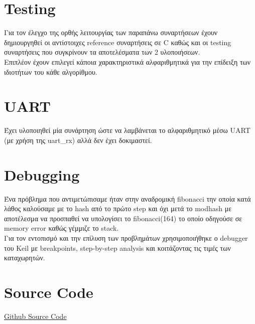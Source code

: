 \documentclass{article}
\begin{document}
\section{Testing}
Για τον έλεγχο της ορθής λειτουργίας των παραπάνω συναρτήσεων έχουν δημιουργηθεί οι αντίστοιχες reference συναρτήσεις σε C καθώς και οι testing συναρτήσεις που συγκρίνουν τα αποτελέσματα των 2 υλοποιήσεων. \\
Επιπλέον έχουν επιλεγεί κάποια χαρακτηριστικά αλφαριθμητικά για την επίδειξη των ιδιοτήτων του κάθε αλγορίθμου. \\

\section{UART}
Έχει υλοποιηθεί μία συνάρτηση ώστε να λαμβάνεται το αλφαριθμητικό μέσω UART (με χρήση της uart\_rx) αλλά δεν έχει δοκιμαστεί. \\

\section{Debugging}
Ένα πρόβλημα που αντιμετώπισαμε ήταν στην αναδρομική fibonacci την οποία κατά λάθος καλούσαμε με το hash από το πρώτο step και όχι μετά το modhash με αποτέλεσμα να προσπαθεί να υπολογίσει το fibonacci(164) το οποίο οδηγούσε σε memory error καθώς γέμμιζε το stack. \\
Για τον εντοπισμό και την επίλυση των προβλημάτων χρησιμοποιήθηκε ο debugger του Keil με breakpoints, step-by-step analysis και κοιτάζοντας τις τιμές των καταχωρητών. \\

\section{Source Code}
\href{https://github.com/charisvt/micro-lab1}{Github Source Code} \\
\end{document}
